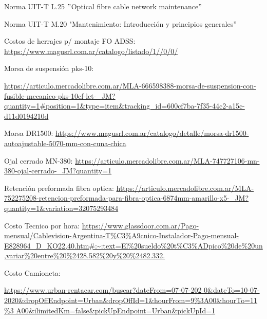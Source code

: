 %


\newpage


\begin{thebibliography}{99}

Norma UIT-T L.25 $"$Optical fibre cable network maintenance''

Norma UIT-T M.20 "Mantenimiento: Introducción y principios generales''


Costos de herrajes p/ montaje FO ADSS: \url{https://www.magusrl.com.ar/catalogo/listado/1//0/0/}

Morsa de suspensión pks-10: \begin{tiny}
\url{https://articulo.mercadolibre.com.ar/MLA-666598388-morsa-de-suspension-con-fusible-mecanico-pks-10cf-lct-_JM?quantity=1#position=1&type=item&tracking_id=600cf7ba-7f35-44c2-a15c-d11d0194210d
}
\end{tiny}

Morsa DR1500: \url{https://www.magusrl.com.ar/catalogo/detalle/morsa-dr1500-autoajustable-5070-mm-con-cuna-chica
}

Ojal cerrado MN-380: \url{https://articulo.mercadolibre.com.ar/MLA-747727106-mn-380-ojal-cerrado-_JM?quantity=1
}

Retención preformada fibra optica: \url{https://articulo.mercadolibre.com.ar/MLA-752275208-retencion-preformada-para-fibra-optica-6874mm-amarillo-x5-_JM?quantity=1&variation=32075293484}

 Costo Tecnico por hora: 
{\tiny \url{https://www.glassdoor.com.ar/Pago-mensual/Cablevision-Argentina-T\%C3\%A9cnico-Instalador-Pago-mensual-E828964_D_KO22,40.htm#:~:text=El\%20sueldo\%20t\%C3\%ADpico\%20de\%20un,variar\%20entre\%20\%2428.582\%20y\%20\%2482.332.}}


 Costo Camioneta: 
\begin{tiny}
\url{https://www.urban-rentacar.com/buscar?dateFrom=07-07-202
0&dateTo=10-07-2020&dropOffEndpoint=Urban&dropOffId=1&hourFrom=9%
A00&ilimitedKm=false&pickUpEndpoint=Urban&pickUpId=1}
\end{tiny}








\end{thebibliography}


\newpage

